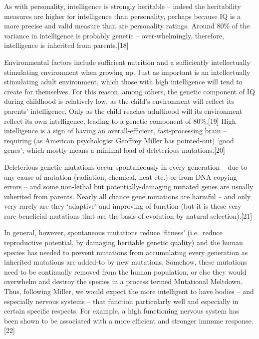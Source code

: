 \documentclass[
]{book}
\begin{document}
As with personality, intelligence is strongly heritable -- indeed the heritability measures are higher for intelligence than personality, perhaps because IQ is a more precise and valid measure than are personality ratings. Around 80\% of the variance in intelligence is probably genetic -- over-whelmingly, therefore, intelligence is inherited from parents.{[}18{]}

Environmental factors include sufficient nutrition and a sufficiently intellectually stimulating environment when growing up. Just as important is an intellectually stimulating adult environment, which those with high intelligence will tend to create for themselves. For this reason, among others, the genetic component of IQ during childhood is relatively low, as the child's environment will reflect its parents' intelligence. Only as the child reaches adulthood will its environment reflect its own intelligence, leading to a genetic component of 80\%.{[}19{]}
High intelligence is a sign of having an overall-efficient, fast-processing brain -- requiring (as American psychologist Geoffrey Miller has pointed-out) `good genes'; which mostly means a minimal load of deleterious mutations.{[}20{]}

Deleterious genetic mutations occur spontaneously in every generation -- due to any cause of mutation (radiation, chemical, heat etc.) or from DNA copying errors -- and some non-lethal but potentially-damaging mutated genes are usually inherited from parents. Nearly all chance gene mutations are harmful -- and only very rarely are they `adaptive' and improving of function (but it is these very rare beneficial mutations that are the basis of evolution by natural selection).{[}21{]}

In general, however, spontaneous mutations reduce `fitness' (i.e.~reduce reproductive potential, by damaging heritable genetic quality) and the human species has needed to prevent mutations from accumulating every generation as inherited mutations are added-to by new mutations. Somehow, these mutations need to be continually removed from the human population, or else they would overwhelm and destroy the species in a process termed Mutational Meltdown. Thus, following Miller, we would expect the more intelligent to have bodies -- and especially nervous systems -- that function particularly well and especially in certain specific respects. For example, a high functioning nervous system has been shown to be associated with a more efficient and stronger immune response.{[}22{]}
\end{document}
